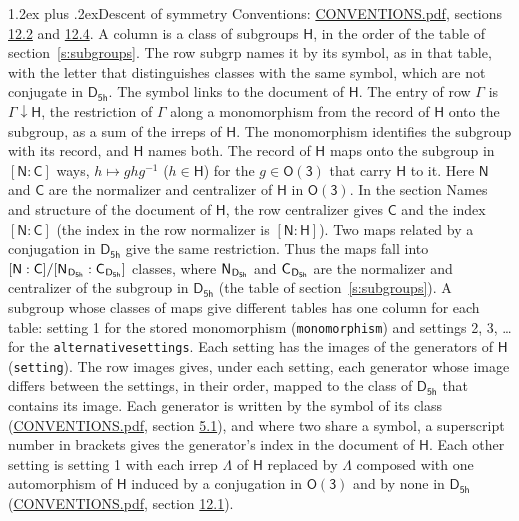 \documentclass[10pt,a4paper]{article}
\makeatletter
\renewcommand\section{\@startsection{section}{1}{\z@}{-3ex plus -1ex minus -.2ex}%
  {1.2ex plus .2ex}{\normalfont\large\sffamily\bfseries\color{parttitle}}}
\numberwithin{equation}{section}
\newcommand{\grp}[1]{\mathsf{#1}}
\newcommand{\grpindex}[2]{[#1 : #2]}
\newcommand{\restr}[2]{#1\!\downarrow#2}
\newcommand{\hairsp}{\mkern1mu}
\makeatother
\begin{document}
\section{Descent of symmetry}\label{s:subduction}
Conventions: \href{../../CONVENTIONS.pdf}{CONVENTIONS.pdf}, sections \href{../../CONVENTIONS.pdf\#conv.12.2}{12.2} and \href{../../CONVENTIONS.pdf\#conv.12.4}{12.4}.
A column is a class of subgroups $\grp{H}$, in the order of the table of section~\ref{s:subgroups}. The row subgrp names it by its symbol, as in that table, with the letter that distinguishes classes with the same symbol, which are not conjugate in $\grp{D_{5h}}$. The symbol links to the document of $\grp{H}$. The entry of row $\Gamma$ is $\restr{\Gamma}{\grp{H}}$, the restriction of $\Gamma$ along a monomorphism from the record of $\grp{H}$ onto the subgroup, as a sum of the irreps of $\grp{H}$. The monomorphism identifies the subgroup with its record, and $\grp{H}$ names both. \label{n:group.normalizer.o3}\label{n:group.centralizer.o3}The record of $\grp{H}$ maps onto the subgroup in $\grpindex{\grp{N}}{\grp{C}}$ ways, $h \mapsto g h g^{-1}$ ($h \in \grp{H}$) for the $g \in \grp{O(3)}$ that carry $\grp{H}$ to it. Here $\grp{N}$ and $\grp{C}$ are the normalizer and centralizer of $\grp{H}$ in \href{O3.pdf}{$\grp{O(3)}$}. In the section Names and structure of the document of $\grp{H}$, the row centralizer gives $\grp{C}$ and the index $\grpindex{\grp{N}}{\grp{C}}$ (the index in the row normalizer is $\grpindex{\grp{N}}{\grp{H}}$). Two maps related by a conjugation in $\grp{D_{5h}}$ give the same restriction. Thus the maps fall into $\grpindex{\grp{N}}{\grp{C}}/\grpindex{\grp{N}_{\hairsp \grp{D_{5h}}}}{\grp{C}_{\hairsp \grp{D_{5h}}}}$ classes, where $\grp{N}_{\hairsp \grp{D_{5h}}}$ and $\grp{C}_{\hairsp \grp{D_{5h}}}$ are the normalizer and centralizer of the subgroup in $\grp{D_{5h}}$ (the table of section~\ref{s:subgroups}). \label{n:head.setting}A subgroup whose classes of maps give different tables has one column for each table: setting 1 for the stored monomorphism (\texttt{monomorphism}) and settings 2, 3, \dots{} for the \texttt{alternativesettings}. Each setting has the images of the generators of $\grp{H}$ (\texttt{setting}). \label{n:head.images}The row images gives, under each setting, each generator whose image differs between the settings, in their order, mapped to the class of $\grp{D_{5h}}$ that contains its image. Each generator is written by the symbol of its class (\href{../../CONVENTIONS.pdf}{CONVENTIONS.pdf}, section \href{../../CONVENTIONS.pdf\#conv.5.1}{5.1}), and where two share a symbol, a superscript number in brackets gives the generator's index in the document of $\grp{H}$. \label{n:irrep.Delta}Each other setting is setting 1 with each irrep $\Lambda$ of $\grp{H}$ replaced by $\Lambda$ composed with one automorphism of $\grp{H}$ induced by a conjugation in \href{O3.pdf}{$\grp{O(3)}$} and by none in $\grp{D_{5h}}$ (\href{../../CONVENTIONS.pdf}{CONVENTIONS.pdf}, section \href{../../CONVENTIONS.pdf\#conv.12.1}{12.1}).
\end{document}

